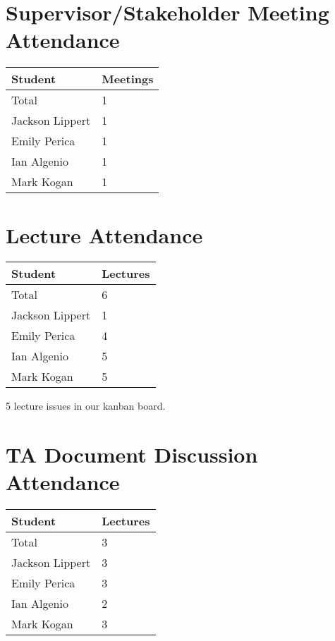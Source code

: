 \documentclass{article}
\begin{document}
\section{Supervisor/Stakeholder Meeting Attendance}

\begin{table}[H]
\centering
\begin{tabular}{ll}
\toprule
\textbf{Student} & \textbf{Meetings}\\
\midrule
Total & 1\\
Jackson Lippert & 1\\
Emily Perica & 1\\
Ian Algenio & 1\\
Mark Kogan & 1\\
\bottomrule
\end{tabular}
\end{table}

\section{Lecture Attendance}

\begin{table}[H]
\centering
\begin{tabular}{ll}
\toprule
\textbf{Student} & \textbf{Lectures}\\
\midrule
Total & 6\\
Jackson Lippert & 1\\
Emily Perica & 4\\
Ian Algenio & 5\\
Mark Kogan & 5\\
\bottomrule
\end{tabular}
\end{table}

5 lecture issues in our kanban board. 

\section{TA Document Discussion Attendance}

\begin{table}[H]
\centering
\begin{tabular}{ll}
\toprule
\textbf{Student} & \textbf{Lectures}\\
\midrule
Total & 3\\
Jackson Lippert & 3\\
Emily Perica & 3\\
Ian Algenio & 2\\
Mark Kogan & 3\\
\bottomrule
\end{tabular}
\end{table}
\end{document}

